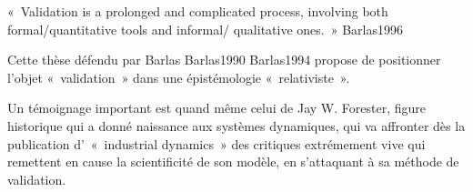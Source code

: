 « Validation is a prolonged and complicated process, involving both formal/quantitative tools and informal/ qualitative ones. » {Barlas1996}

Cette thèse défendu par Barlas {Barlas1990} {Barlas1994} propose de positionner  l'objet « validation » dans une épistémologie « relativiste ».

Un témoignage important est quand même celui de Jay W. Forester, figure historique qui a donné naissance aux systèmes dynamiques, qui va affronter dès la publication d' « industrial dynamics » des critiques extrémement vive qui remettent en cause la scientificité de son modèle, en s'attaquant à sa méthode de validation.
